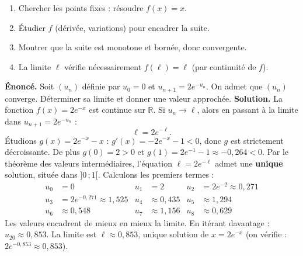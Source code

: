 \documentclass[11pt]{article}
\newcommand{\cle}[1]{{\popxbold\color{popdark}#1}}
\begin{document}
\begin{methode}[Étudier la convergence d'une suite $u_{n+1}=f(u_n)$]
\begin{enumerate}
\item Chercher les \cle{points fixes} : résoudre $f(x)=x$.
\item Étudier $f$ (dérivée, variations) pour encadrer la suite.
\item Montrer que la suite est monotone et bornée, donc convergente.
\item La limite $\ell$ vérifie nécessairement $f(\ell)=\ell$ (par continuité de $f$).
\end{enumerate}
\end{methode}

\begin{exoresolu}[Convergence de la suite $u_{n+1}=2e^{-u_n}$]
\textbf{Énoncé.} Soit $(u_n)$ définie par $u_0 = 0$ et $u_{n+1} = 2e^{-u_n}$. On admet que $(u_n)$ converge. Déterminer sa limite et donner une valeur approchée.
\tcblower
\textbf{Solution.} La fonction $f(x)=2e^{-x}$ est continue sur $\mathbb{R}$. Si $u_n\to\ell$, alors en passant à la limite dans $u_{n+1}=2e^{-u_n}$ :
\[ \ell = 2e^{-\ell}. \]
Étudions $g(x)=2e^{-x}-x$ : $g'(x)=-2e^{-x}-1<0$, donc $g$ est strictement décroissante. De plus $g(0)=2>0$ et $g(1)=2e^{-1}-1\approx -0,264<0$. Par le théorème des valeurs intermédiaires, l'équation $\ell=2e^{-\ell}$ admet une \textbf{unique} solution, située dans $]0\,;1[$.
Calculons les premiers termes :
\begin{align*}
u_0 &= 0 & u_1 &= 2 & u_2 &= 2e^{-2}\approx 0,271\\
u_3 &= 2e^{-0,271}\approx 1,525 & u_4 &\approx 0,435 & u_5 &\approx 1,294\\
u_6 &\approx 0,548 & u_7 &\approx 1,156 & u_8 &\approx 0,629
\end{align*}
Les valeurs encadrent de mieux en mieux la limite. En itérant davantage : $u_{20}\approx 0,853$. La limite est $\ell \approx 0,853$, unique solution de $x=2e^{-x}$ (on vérifie : $2e^{-0,853}\approx 0,853$).
\end{exoresolu}
\end{document}
